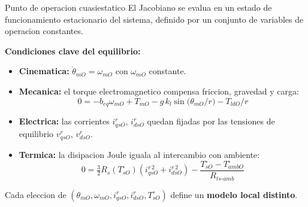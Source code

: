 \documentclass[aspectratio=169,t]{beamer}
\begin{document}
\begin{frame}{Punto de operacion cuasiestatico}
{\small\color{uncGray}El Jacobiano se evalua en un estado de funcionamiento estacionario del sistema, definido por un conjunto de variables de operacion constantes.}\par
\vspace{3mm}

\textbf{Condiciones clave del equilibrio:}
\begin{itemize}
  \item \textbf{Cinematica:} $\dot{\theta}_{mO}=\omega_{mO}$ con $\omega_{mO}$ constante.
  \item \textbf{Mecanica:} el torque electromagnetico compensa friccion, gravedad y carga:
  \[
  0=-b_{eq}\omega_{mO}+T_{mO}-g\,k_l\sin\!\big(\theta_{mO}/r\big)-T_{ldO}/r
  \]
  \item \textbf{Electrica:} las corrientes $i_{qsO}^r$, $i_{dsO}^r$ quedan fijadas por las tensiones de equilibrio $v_{qsO}^r$, $v_{dsO}^r$.
  \item \textbf{Termica:} la disipacion Joule iguala al intercambio con ambiente:
  \[
  0=\tfrac{3}{2}R_s(T_{sO}^\circ)\!\left(i_{qsO}^{r\,2}+i_{dsO}^{r\,2}\right)-\frac{T_{sO}^\circ-T_{ambO}^\circ}{R_{ts\text{-}amb}}
  \]
\end{itemize}

{\small Cada eleccion de $(\theta_{mO},\omega_{mO},i_{qsO}^r,i_{dsO}^r,T_{sO}^\circ)$ define un \textbf{modelo local distinto}.}
\end{frame}
\end{document}
